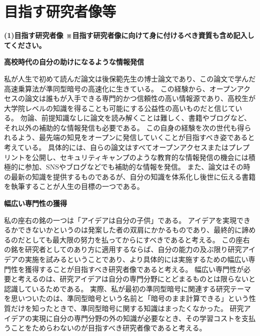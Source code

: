 
\section{目指す研究者像等}

\noindent
\textbf{(1)目指す研究者像 {\footnotesize ※目指す研究者像に向けて身に付けるべき資質も含め記入してください。}}


\noindent\textbf{高校時代の自分の助けになるような情報発信}

私が人生で初めて読んだ論文は後保範先生の博士論文であり、この論文で学んだ高速乗算法が準同型暗号の高速化に生きている。
この経験から、オープンアクセスの論文は誰もが入手できる専門的かつ信頼性の高い情報源であり、高校生が大学院レベルの知識を得ることも可能にする公益性の高いものだと信じている。
勿論、前提知識なしに論文を読み解くことは難しく、書籍やブログなど、それ以外の補助的な情報発信も必要である。
この自身の経験を次の世代も得られるよう、最先端の知見をオープンに発信していくことが目指すべき姿であると考えている。
具体的には、自らの論文はすべてオープンアクセスまたはプレプリントを公開し、セキュリティキャンプのような教育的な情報発信の機会には積極的に参加、SNSやブログなどでも補助的な情報を発信。
また、論文はその時の最新の知識を提供するものであるが、自分の知識を体系化し後世に伝える書籍を執筆することが人生の目標の一つである。

\noindent\textbf{幅広い専門性の獲得}

私の座右の銘の一つは「アイデアは自分の子供」である。
アイデアを実現できるかできないかというのは発案した者の双肩にかかるものであり、最終的に諦めるのだとしても最大限の努力を払ってからにすべきであると考える。
この座右の銘を研究者としてのあり方に適用するならば、自分の能力の及ぶ限り研究アイデアの実施を試みるということであり、より具体的には実施するための幅広い専門性を獲得することが目指すべき研究者像であると考える。
幅広い専門性が必要と考えるのは、研究アイデアは自分の専門分野にとどまるものとは限らないと認識しているためである。
実際、私が最初の準同型暗号に関連する研究テーマを思いついたのは、準同型暗号という名前と「暗号のまま計算できる」という性質だけを知ったときで、準同型暗号に関する知識はまったくなかった。
研究アイデアの実現に自分の専門分野の外の知識が必要なとき、その学習コストを支払うことをためらわないのが目指すべき研究者像であると考える。

